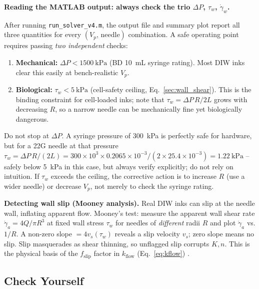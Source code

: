 \documentclass[11pt,a4paper]{article}
\newcommand{\gd}{\dot{\gamma}}
\begin{document}
\begin{inpracticebox}
\textbf{Reading the MATLAB output: always check the trio $\Delta P$,
$\tau_w$, $\gd_w$.}

After running \texttt{run\_solver\_v4.m}, the output file and summary
plot report all three quantities for every $(V_p,\,\text{needle})$
combination. A safe operating point requires passing \emph{two
independent} checks:
\begin{enumerate}[leftmargin=1.6em,itemsep=2pt]
\item \textbf{Mechanical:} $\Delta P < \SI{1500}{\kPa}$ (BD 10~mL syringe
  rating). Most DIW inks clear this easily at bench-realistic $V_p$.
\item \textbf{Biological:} $\tau_w < \SI{5}{\kPa}$ (cell-safety ceiling,
  Eq.~\ref{sec:wall_shear}). This is the binding constraint for
  cell-loaded inks; note that $\tau_w=\Delta P\,R/2L$ grows with
  decreasing $R$, so a narrow needle can be mechanically fine yet
  biologically dangerous.
\end{enumerate}
Do not stop at $\Delta P$. A syringe pressure of \SI{300}{\kPa} is
perfectly safe for hardware, but for a 22G needle at that pressure
$\tau_w=\Delta P\,R/(2L)=300\times10^3\times0.2065\times10^{-3}/
(2\times25.4\times10^{-3})=\SI{1.22}{\kPa}$ -- safely below
\SI{5}{\kPa} in this case, but always verify explicitly; do not rely
on intuition. If $\tau_w$ exceeds the ceiling, the corrective action
is to increase $R$ (use a wider needle) or decrease $V_p$, not merely
to check the syringe rating.
\end{inpracticebox}

\begin{goingdeeperbox}
\textbf{Detecting wall slip (Mooney analysis).} Real DIW inks can slip at
the needle wall, inflating apparent flow. Mooney's test: measure the
apparent wall shear rate $\gd_{a}=4Q/\pi R^3$ at fixed wall stress
$\tau_w$ for needles of \emph{different} radii $R$ and plot $\gd_a$ vs.
$1/R$. A non-zero slope $=4 v_s(\tau_w)$ reveals a slip velocity $v_s$;
zero slope means no slip. Slip masquerades as shear thinning, so unflagged
slip corrupts $K,n$. This is the physical basis of the $f_\mathrm{slip}$
factor in $k_\mathrm{flow}$ (Eq.~\ref{eq:kflow}) \citep{Mooney1931}.
\end{goingdeeperbox}

\subsection*{Check Yourself}
\label{sec:hp_exercises}
\end{document}
